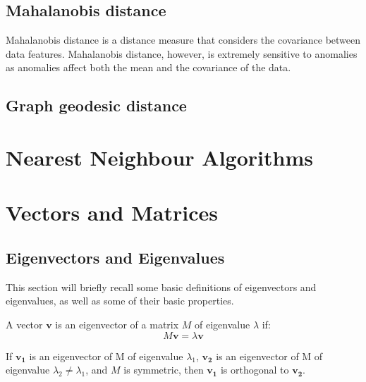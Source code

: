 \subsection{Mahalanobis distance}
\label{sec:mahalanobisDistance}
Mahalanobis distance is a distance measure that considers the covariance between
data features. Mahalanobis distance, however, is extremely sensitive to 
anomalies as anomalies affect both the mean and the covariance of the data.

\subsection{Graph geodesic distance}
\label{sec:graphGeodesicDistance}

\section{Nearest Neighbour Algorithms}
\label{sec:nearestNeighbourAlgorithms}

\section{Vectors and Matrices}
\label{sec:vectorsAndMatrices}

\subsection{Eigenvectors and Eigenvalues}
\label{sec:eigenvectorsAndEigenvalues}
This section will briefly recall some basic definitions of eigenvectors and
eigenvalues, as well as some of their basic properties.

A vector $\mathbf{v}$ is an eigenvector of a matrix $M$ of eigenvalue $\lambda$ 
if:
\begin{displaymath}
M\mathbf{v} = \lambda\textbf{v}
\end{displaymath}

If $\mathbf{v_{1}}$ is an eigenvector of M of eigenvalue $\lambda_{1}$, 
$\mathbf{v_{2}}$ is an eigenvector of M of eigenvalue $\lambda_{2} \neq 
\lambda_{1}$, and $M$ is symmetric, then $\mathbf{v_{1}}$ is orthogonal to 
$\mathbf{v_{2}}$.

